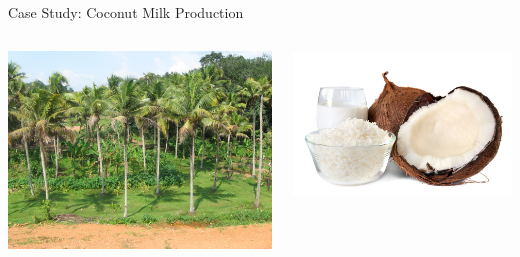 \documentclass[10pt, svgnames]{beamer}
\begin{document}
\begin{frame}[label={sec:org7fc16bf}]{Case Study: Coconut Milk Production}
\begin{columns}
  \begin{column}{0.5\columnwidth}
    \begin{center}
      \includegraphics[width=.9\linewidth]{./pictures/coconut-orchard.JPG}
    \end{center}
  \end{column}

  \begin{column}{0.5\columnwidth}
    \begin{center}
      \includegraphics[width=.9\linewidth]{./pictures/coconut-milk.jpg}
    \end{center}
  \end{column}
\end{columns}
\end{frame}
\end{document}
